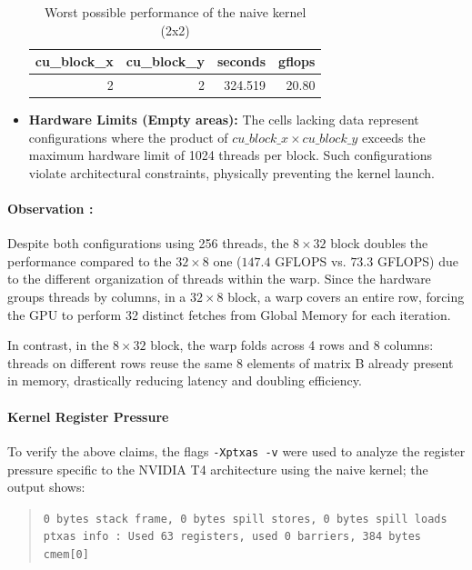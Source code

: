 \begin{itemize}
\begin{table}[h]
\centering
\begin{tabular}{rrrr}
\toprule
cu\_block\_x & cu\_block\_y & seconds & gflops \\
\midrule
2 & 2 & 324.519 & 20.80 \\
\bottomrule
\end{tabular}
\caption{Worst possible performance of the naive kernel (2x2)}
\label{tab:worst_perf}
\end{table}

\item \textbf{Hardware Limits (Empty areas):} The cells lacking data represent configurations where the product of $cu\_block\_x \times cu\_block\_y$ exceeds the maximum hardware limit of 1024 threads per block. Such configurations violate architectural constraints, physically preventing the kernel launch.

\end{itemize}

\paragraph{Observation :} Despite both configurations using 256 threads, the $8 \times 32$ block doubles the performance compared to the $32 \times 8$ one ($ 147.4$ GFLOPS vs. $ 73.3$ GFLOPS) due to the different organization of threads within the warp. Since the hardware groups threads by columns, in a $32 \times 8$ block, a warp covers an entire row, forcing the GPU to perform 32 distinct fetches from Global Memory for each iteration. 

In contrast, in the $8 \times 32$ block, the warp folds across 4 rows and 8 columns: threads on different rows reuse the same 8 elements of matrix B already present in memory, drastically reducing latency and doubling efficiency.


\paragraph{Kernel Register Pressure}
To verify the above claims, the flags \texttt{-Xptxas -v} were used to analyze the register pressure specific to the NVIDIA T4 architecture using the naive kernel; the output shows:

\begin{quote}
    \texttt{0 bytes stack frame, 0 bytes spill stores, 0 bytes spill loads \\
    ptxas info : Used 63 registers, used 0 barriers, 384 bytes cmem[0]}
\end{quote}

